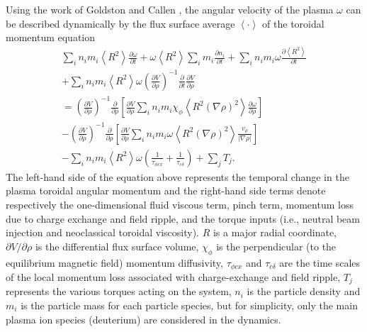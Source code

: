 \documentclass[12pt,lot, lof]{puthesis}
\begin{document}
Using the work of Goldston \cite{Goldston86}  and Callen  \cite{Callen09}, the angular velocity of the plasma $\omega$ can be described dynamically by the flux surface average $\left<\cdot\right>$ of the toroidal momentum equation 
\begin{multline}
  \sum_i n_i m_i \left<R^2\right> \frac{\partial \omega}{\partial t}
  + \omega \left<R^2\right> \sum_i m_i \frac{\partial n_i}{\partial t} 
  + \sum_i n_i m_i \omega \frac{\partial \left<R^2\right>}{\partial t} \\
  + \sum_i n_i m_i \left<R^2\right> \omega \left( \frac{\partial V}{\partial\rho}\right)^{-1} \frac{\partial}{\partial t} \frac{\partial V}{\partial \rho} \\
  = \left( \frac{\partial V}{\partial\rho}\right)^{-1}\frac{\partial}{\partial \rho} \left[\frac{\partial V}{\partial \rho}\sum_i n_i m_i \chi_\phi \left< R^2 (\nabla \rho)^2\right> \frac{\partial\omega}{\partial\rho}\right] \\
  - \left( \frac{\partial V}{\partial\rho}\right)^{-1}\frac{\partial}{\partial \rho} \left[\frac{\partial V}{\partial \rho}\sum_i n_i m_i \omega \left< R^2 (\nabla \rho)^2\right> \frac{v_\rho}{|\nabla\rho|}\right] \\
  - \sum_i n_i m_i \left< R^2\right> \omega \left( \frac{1}{\tau_{\phi cx}} + \frac{1}{\tau_{c\delta}}\right) + \sum_j T_j.
	\label{eq:full1}
\end{multline}
The left-hand side of the equation above represents the temporal change in the plasma toroidal angular momentum and the right-hand side terms denote respectively the one-dimensional fluid viscous term, pinch term, momentum loss due to charge exchange and field ripple, and the torque inputs (i.e., neutral beam injection and neoclassical toroidal viscosity). $R$ is a major radial coordinate, $\partial V/\partial\rho$ is the differential flux surface volume, $\chi_\phi$ is the perpendicular (to the equilibrium magnetic field) momentum diffusivity, $\tau_{\phi c x}$ and $\tau_{c\delta}$ are the time scales of the local momentum loss associated with charge-exchange and field ripple, $T_j$ represents the various torques acting on the system, $n_i$ is the particle density and $m_i$ is the particle mass for each particle species, but for simplicity, only the main plasma ion species (deuterium) are considered in the dynamics.
\end{document}
